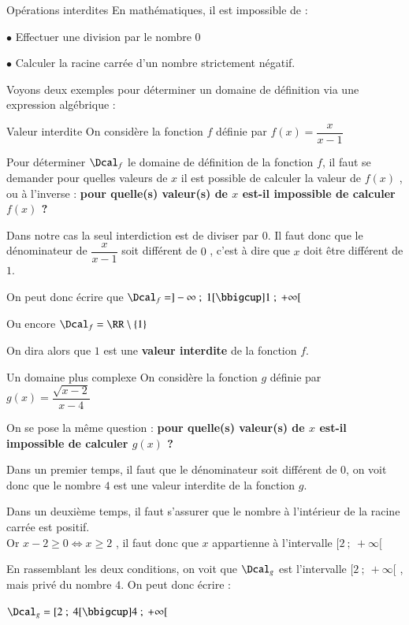 \documentclass[oneside,12pt]{article}          %
\begin{document}
\begin{rappel}{Opérations interdites}
	En mathématiques, il est impossible de :
	
	$\bullet$ Effectuer une division par le nombre $0$
	
	$\bullet$ Calculer la racine carrée d'un nombre strictement négatif.
\end{rappel}



Voyons deux exemples pour déterminer un domaine de définition via une expression algébrique :

\begin{exemple}{Valeur interdite}
	On considère la fonction $f$ définie par $f(x)=\dfrac{x}{x-1}$
	
	Pour déterminer $\Dcal_f$ le domaine de définition de la fonction $f$, il faut se demander pour quelles valeurs de $x$ il est possible de calculer la valeur de $f(x)$ , ou à l'inverse : \textbf{pour quelle(s) valeur(s) de $x$ est-il impossible de calculer $f(x)$ ?}
	
	Dans notre cas la seul interdiction est de diviser par $0$. Il faut donc que le dénominateur de $\dfrac{x}{x-1}$ soit différent de $0$ , c'est à dire que $x$ doit être différent de $1$.
	
	On peut donc écrire que $\Dcal_f = ]-\infty ~;~ 1[ \bbigcup ]1 ~;~ +\infty[$
	
	Ou encore $\Dcal_f = \RR \setminus \{ 1 \}$
	
	On dira alors que $1$ est une \textbf{valeur interdite} de la fonction $f$.
\end{exemple}

\begin{exemple}{Un domaine plus complexe}
	On considère la fonction $g$ définie par $g(x) = \dfrac{\sqrt{x-2}}{x-4}$
	
	On se pose la même question : \textbf{pour quelle(s) valeur(s) de $x$ est-il impossible de calculer $g(x)$ ?}
	
	Dans un premier temps, il faut que le dénominateur soit différent de $0$, on voit donc que le nombre $4$ est une valeur interdite de la fonction $g$.
	
	Dans un deuxième temps, il faut s'assurer que le nombre à l'intérieur de la racine carrée est positif. \\
	Or $x-2 \geq 0 \Longleftrightarrow x \geq 2$ , il faut donc que $x$ appartienne à l'intervalle $[2 ~;~ +\infty[$
	
	En rassemblant les deux conditions, on voit que $\Dcal_g$ est l'intervalle $[2 ~;~ +\infty[$ , mais privé du nombre $4$. On peut donc écrire :
	
	$\Dcal_g = [2 ~;~ 4[ \bbigcup ]4 ~;~ +\infty[$
\end{exemple}
\end{document}
